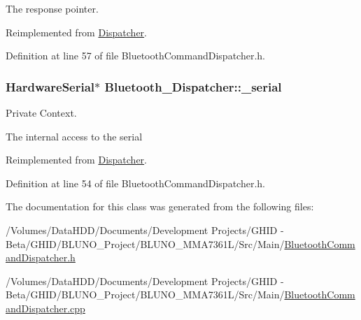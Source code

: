 \-The response pointer. 



\-Reimplemented from \hyperlink{class_dispatcher_a0e3c3d9054c4d8180aa56655bb6206a2}{\-Dispatcher}.



\-Definition at line 57 of file \-Bluetooth\-Command\-Dispatcher.\-h.

\hypertarget{class_bluetooth___dispatcher_a9b30fd1951f4e064a707ec75b941d18e}{
\subsubsection[{\-\_\-serial}]{\setlength{\rightskip}{0pt plus 5cm}\-Hardware\-Serial$\ast$ {\bf \-Bluetooth\-\_\-\-Dispatcher\-::\-\_\-serial}}}\label{class_bluetooth___dispatcher_a9b30fd1951f4e064a707ec75b941d18e}


\-Private \-Context. 

\-The internal access to the serial 

\-Reimplemented from \hyperlink{class_dispatcher_ab761cd7589c1d5fda8ff1b5ec4ce679f}{\-Dispatcher}.



\-Definition at line 54 of file \-Bluetooth\-Command\-Dispatcher.\-h.



\-The documentation for this class was generated from the following files\-:\begin{DoxyCompactItemize}
\item 
/\-Volumes/\-Data\-H\-D\-D/\-Documents/\-Development Projects/\-G\-H\-I\-D -\/ Beta/\-G\-H\-I\-D/\-B\-L\-U\-N\-O\-\_\-\-Project/\-B\-L\-U\-N\-O\-\_\-\-M\-M\-A7361\-L/\-Src/\-Main/\hyperlink{_bluetooth_command_dispatcher_8h}{\-Bluetooth\-Command\-Dispatcher.\-h}\item 
/\-Volumes/\-Data\-H\-D\-D/\-Documents/\-Development Projects/\-G\-H\-I\-D -\/ Beta/\-G\-H\-I\-D/\-B\-L\-U\-N\-O\-\_\-\-Project/\-B\-L\-U\-N\-O\-\_\-\-M\-M\-A7361\-L/\-Src/\-Main/\hyperlink{_bluetooth_command_dispatcher_8cpp}{\-Bluetooth\-Command\-Dispatcher.\-cpp}\end{DoxyCompactItemize}
